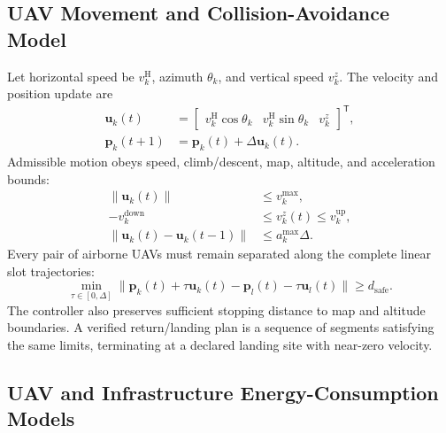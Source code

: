 \documentclass[journal]{IEEEtran}
\begin{document}
\subsection{UAV Movement and Collision-Avoidance Model}
Let horizontal speed be $v_k^{\mathrm H}$, azimuth $\theta_k$, and
vertical speed $v_k^z$.  The velocity and position update are
\begin{equation}
\begin{aligned}
\boldsymbol u_k(t)&=
\begin{bmatrix}
v_k^{\mathrm H}\cos\theta_k&
v_k^{\mathrm H}\sin\theta_k&v_k^z
\end{bmatrix}^{\mathsf T},\\
\boldsymbol p_k(t+1)&=\boldsymbol p_k(t)+\Delta\boldsymbol u_k(t).
\end{aligned}
\label{eq:uav_motion}
\end{equation}
Admissible motion obeys speed, climb/descent, map, altitude, and
acceleration bounds:
\begin{equation}
\begin{aligned}
\|\boldsymbol u_k(t)\|&\le v_k^{\max},\\
-v_k^{\mathrm{down}}&\le v_k^z(t)\le v_k^{\mathrm{up}},\\
\|\boldsymbol u_k(t)-\boldsymbol u_k(t-1)\|&\le a_k^{\max}\Delta.
\end{aligned}
\label{eq:flight_bounds}
\end{equation}
Every pair of airborne UAVs must remain separated along the complete
linear slot trajectories:
\begin{equation}
\min_{\tau\in[0,\Delta]}
\|\boldsymbol p_k(t)+\tau\boldsymbol u_k(t)
-\boldsymbol p_l(t)-\tau\boldsymbol u_l(t)\|
\ge d_{\mathrm{safe}}.
\label{eq:collision}
\end{equation}
The controller also preserves sufficient stopping distance to map and
altitude boundaries.  A verified return/landing plan is a sequence of
segments satisfying the same limits, terminating at a declared landing
site with near-zero velocity.

\subsection{UAV and Infrastructure Energy-Consumption Models}
\end{document}
